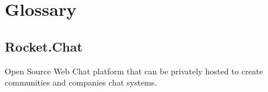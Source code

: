 \section{Glossary}

\subsection{Rocket.Chat}
Open Source Web Chat platform that can be privately hosted to create communities and companies chat systems.
